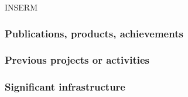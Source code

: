 \begin{sitedescription}{INSERM}
\subsubsection*{Publications, products, achievements}

\begin{compactenum}
\item {}
\end{compactenum}

\subsubsection*{Previous projects or activities}

\begin{compactenum}
\item {}
\end{compactenum}

\subsubsection*{Significant infrastructure}

\end{sitedescription}

